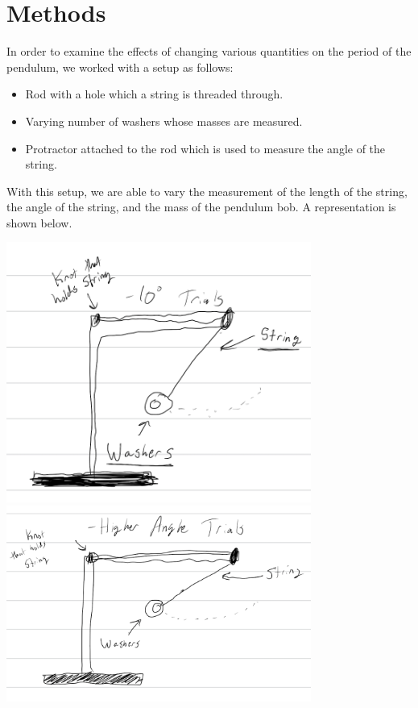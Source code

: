 \documentclass[10pt]{extarticle}
\begin{document}
{\section*{Methods}
In order to examine the effects of changing various quantities on the period of the pendulum, we worked with a setup as follows:
  \begin{itemize}
    \item Rod with a hole which a string is threaded through.
    \item Varying number of washers whose masses are measured.
    \item Protractor attached to the rod which is used to measure the angle of the string. 
  \end{itemize}
With this setup, we are able to vary the measurement of the length of the string, the angle of the string, and the mass of the pendulum bob. A representation is shown below.
  \begin{center}
    \includegraphics[width=10cm]{Lab9Image1} \\
    \includegraphics[width=10cm]{Lab9Image2}
  \end{center}
}
\end{document}
